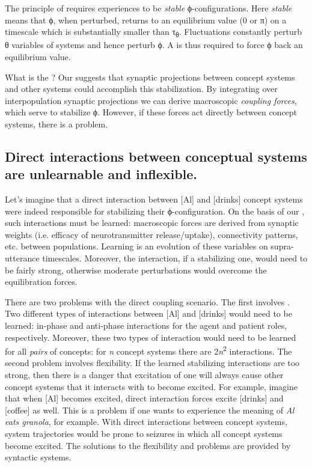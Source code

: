   The principle of  requires  experiences to be \textit{stable} ϕ-configurations. Here \textit{stable} means that ϕ, when perturbed, returns to an equilibrium value (0 or π) on a timescale which is substantially smaller than τ\textsubscript{θ}. Fluctuations constantly perturb θ variables of systems and hence perturb ϕ. A  is thus required to force ϕ back an equilibrium value. 

  What is the ? Our  suggests that synaptic projections between concept systems and other systems could accomplish this stabilization. By integrating over interpopulation synaptic projections we can derive macroscopic \textit{coupling forces}, which serve to stabilize ϕ. However, if these forces act directly between concept systems, there is a problem.

\subsection{Direct interactions between conceptual systems are unlearnable and inflexible.} 

Let's imagine that a direct interaction between [Al] and [drinks] concept systems were indeed responsible for stabilizing their ϕ-configuration. On the basis of our , such interactions must be learned: macroscopic forces are derived from synaptic weights (i.e. efficacy of neurotransmitter release/uptake), connectivity patterns, etc. between populations. Learning is an evolution of these variables on supra-utterance timescales. Moreover, the interaction, if a stabilizing one, would need to be fairly strong, otherwise moderate perturbations would overcome the equilibration forces. 

  There are two problems with the direct coupling scenario. The first involves . Two different types of interactions between [Al] and [drinks] would need to be learned: in-phase and anti-phase interactions for the agent and patient roles, respectively. Moreover, these two types of interaction would need to be learned for all \textit{pairs} of concepts: for \textit{n} concept systems there are 2\textit{n}\textsuperscript{2} interactions. The second problem involves flexibility. If the learned stabilizing interactions are too strong, then there is a danger that excitation of one  will always cause other concept systems that it interacts with to become excited. For example, imagine that when [Al] becomes excited, direct interaction forces excite [drinks] and [coffee] as well. This is a problem if one wants to experience the meaning of \textit{Al eats granola}, for example. With direct interactions between concept systems, system trajectories would be prone to seizures in which all concept systems become excited. The solutions to the flexibility and  problems are provided by syntactic systems.

